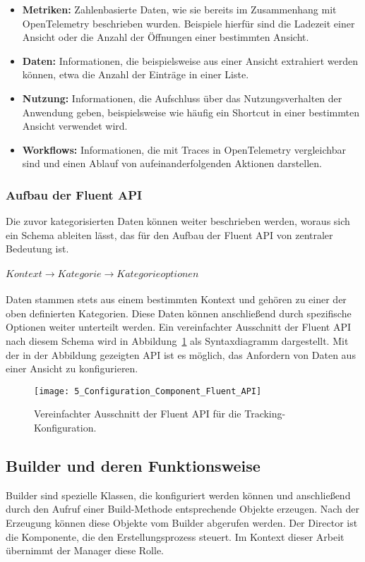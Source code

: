 \begin{itemize}
    \item \textbf{Metriken:} Zahlenbasierte Daten, wie sie bereits im Zusammenhang mit OpenTelemetry beschrieben wurden. Beispiele hierfür sind die Ladezeit einer Ansicht oder die Anzahl der Öffnungen einer bestimmten Ansicht.
    \item \textbf{Daten:} Informationen, die beispielsweise aus einer Ansicht extrahiert werden können, etwa die Anzahl der Einträge in einer Liste.
    \item \textbf{Nutzung:} Informationen, die Aufschluss über das Nutzungsverhalten der Anwendung geben, beispielsweise wie häufig ein Shortcut in einer bestimmten Ansicht verwendet wird.
    \item \textbf{Workflows:} Informationen, die mit Traces in OpenTelemetry vergleichbar sind und einen Ablauf von aufeinanderfolgenden Aktionen darstellen.
\end{itemize}

\subsubsection{Aufbau der Fluent API}
Die zuvor kategorisierten Daten können weiter beschrieben werden, woraus sich ein Schema ableiten lässt, das für den Aufbau der Fluent API von zentraler Bedeutung ist.\\
\\
$Kontext \rightarrow Kategorie \rightarrow Kategorieoptionen$\\
\\
Daten stammen stets aus einem bestimmten Kontext und gehören zu einer der oben definierten Kategorien. Diese Daten können anschließend durch spezifische Optionen weiter unterteilt werden. Ein vereinfachter Ausschnitt der Fluent API nach diesem Schema wird in Abbildung~\ref{fig:configuration_component_fluent_api} als Syntaxdiagramm dargestellt. Mit der in der Abbildung gezeigten API ist es möglich, das Anfordern von Daten aus einer Ansicht zu konfigurieren.

\begin{figure}[H]
    \centering
    \texttt{[image: 5\_Configuration\_Component\_Fluent\_API]}
    \caption{Vereinfachter Ausschnitt der Fluent API für die Tracking-Konfiguration.}
    \label{fig:configuration_component_fluent_api}
\end{figure}

\subsection{Builder und deren Funktionsweise}
\label{subsec:builder_functionality_usage}
Builder \cite{sarcar2004design} sind spezielle Klassen, die konfiguriert werden können und anschließend durch den Aufruf einer Build-Methode entsprechende Objekte erzeugen. Nach der Erzeugung können diese Objekte vom Builder abgerufen werden. Der Director ist die Komponente, die den Erstellungsprozess steuert. Im Kontext dieser Arbeit übernimmt der Manager diese Rolle.


